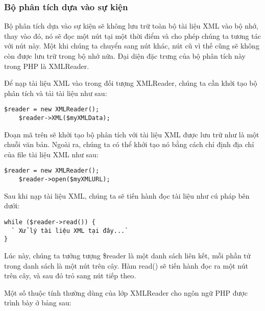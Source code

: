 \subsubsection{Bộ phân tích dựa vào sự kiện}
Bộ phân tích dựa vào sự kiện sẽ không lưu trữ toàn bộ tài liệu XML vào bộ nhớ, thay vào đó, nó sẽ đọc một nút tại một thời điểm và cho phép chúng ta tương tác với nút này. Một khi chúng ta chuyển sang nút khác, nút cũ vì thế cũng sẽ không còn được lưu trữ trong bộ nhớ nữa. Đại diện đặc trưng của bộ phân tích này trong PHP là XMLReader.

Để nạp tài liệu XML vào trong đối tượng XMLReader, chúng ta cần khởi tạo bộ phân tích và tải tài liệu như sau:
\lstset{language=XML}
\begin{lstlisting}[escapechar=`]
	$reader = new XMLReader();
	$reader->XML($myXMLData);
\end{lstlisting}

Đoạn mã trên sẽ khởi tạo bộ phân tích với tài liệu XML được lưu trữ như là một chuỗi văn bản. Ngoài ra, chúng ta có thể khởi tạo nó bằng cách chỉ định địa chỉ của file tài liệu XML như sau:
\lstset{language=XML}
\begin{lstlisting}[escapechar=`]
	$reader = new XMLReader();
	$reader->open($myXMLURL);
\end{lstlisting}

Sau khi nạp tài liệu XML, chúng ta sẽ tiến hành đọc tài liệu như cú pháp bên dưới:

\lstset{language=XML}
\begin{lstlisting}[escapechar=`]
while ($reader->read()) {
  ` Xử lý tài liệu XML tại đây...`
}
\end{lstlisting}

Lúc này, chúng ta tưởng tượng \$reader là một danh sách liên kết, mỗi phần tử trong danh sách là một nút trên cây. Hàm read() sẽ tiến hành đọc ra một nút trên cây, và sau đó trỏ sang nút tiếp theo.

Một số thuộc tính thường dùng của lớp XMLReader cho ngôn ngữ PHP được trình bày ở bảng sau:


